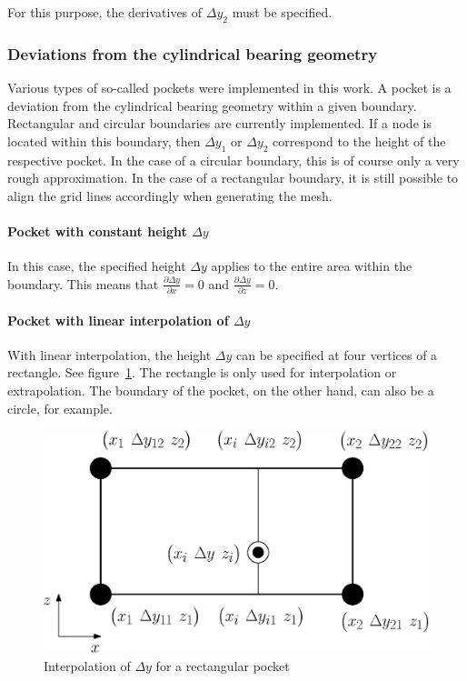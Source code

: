 For this purpose, the derivatives of $\Delta y_2$ must be specified.

\subsubsection{Deviations from the cylindrical bearing geometry}
Various types of so-called pockets were implemented in this work. A pocket is a deviation from the cylindrical bearing geometry within a given boundary. Rectangular and circular boundaries are currently implemented. If a node is located within this boundary, then $\Delta y_1$ or $\Delta y_2$ correspond to the height of the respective pocket. In the case of a circular boundary, this is of course only a very rough approximation. In the case of a rectangular boundary, it is still possible to align the grid lines accordingly when generating the mesh.
\paragraph{Pocket with constant height $\Delta y$}
In this case, the specified height $\Delta y$ applies to the entire area within the boundary. This means that $\frac{\partial \Delta y}{\partial x}=0$ and $\frac{\partial \Delta
y}{\partial z}=0$.

\paragraph{Pocket with linear interpolation of $\Delta y$}
With linear interpolation, the height $\Delta y$ can be specified at four vertices of a rectangle. See figure~\ref{fig:h500}. The rectangle is only used for interpolation or extrapolation. The boundary of the pocket, on the other hand, can also be a circle, for example.

\begin{figure}[htb]
\centering
\includegraphics[width=0.5\linewidth]{fig_h500}
\caption{Interpolation of $\Delta y$ for a rectangular pocket}
\label{fig:h500}
\end{figure}

